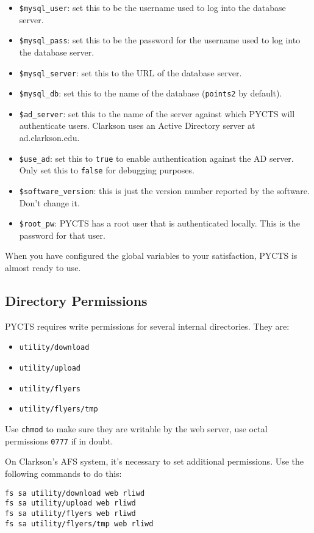 \documentclass[letterpaper,titlepage]{article}
\begin{document}
\begin{itemize}
\item{{\tt \$mysql\_user}: set this to be the username used to log into the database server.}
\item{{\tt \$mysql\_pass}: set this to be the password for the username used to log into the database server.}
\item{{\tt \$mysql\_server}: set this to the URL of the database server.}
\item{{\tt \$mysql\_db}: set this to the name of the database ({\tt points2} by default).}
\item{{\tt \$ad\_server}: set this to the name of the server against which PYCTS will authenticate users. Clarkson uses an Active Directory server at ad.clarkson.edu.}
\item{{\tt \$use\_ad}: set this to {\tt true} to enable authentication against the AD server. Only set this to {\tt false} for debugging purposes.}
\item{{\tt \$software\_version}: this is just the version number reported by the software. Don't change it.}
\item{{\tt \$root\_pw}: PYCTS has a root user that is authenticated locally. This is the password for that user.}
\end{itemize}

When you have configured the global variables to your satisfaction, PYCTS is almost ready to use.

\subsection{Directory Permissions}
PYCTS requires write permissions for several internal directories. They are:
\begin{itemize}
\item{ {\tt utility/download} }
\item{ {\tt utility/upload} }
\item{ {\tt utility/flyers} }
\item{ {\tt utility/flyers/tmp} }
\end{itemize}

Use {\tt chmod} to make sure they are writable by the web server, use octal permissions {\tt 0777} if in doubt.

On Clarkson's AFS system, it's necessary to set additional permissions. Use the following commands to do this:
\begin{verbatim}
fs sa utility/download web rliwd
fs sa utility/upload web rliwd
fs sa utility/flyers web rliwd
fs sa utility/flyers/tmp web rliwd
\end{verbatim}
\end{document}

